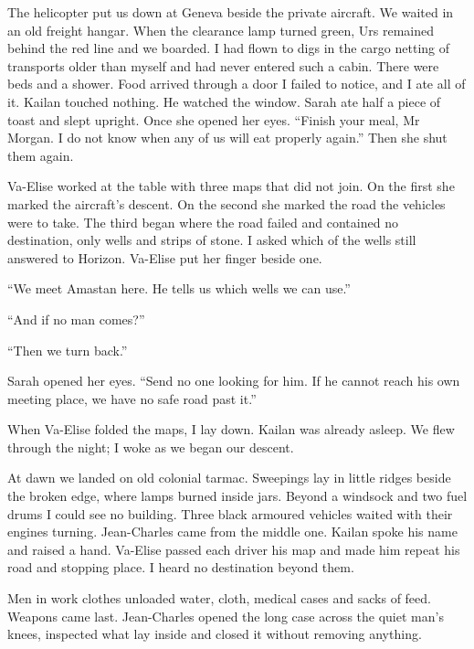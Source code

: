 The helicopter put us down at Geneva beside the private aircraft. We waited in an old freight hangar. When the clearance lamp turned green, Urs remained behind the red line and we boarded. I had flown to digs in the cargo netting of transports older than myself and had never entered such a cabin. There were beds and a shower. Food arrived through a door I failed to notice, and I ate all of it. Kailan touched nothing. He watched the window. Sarah ate half a piece of toast and slept upright. Once she opened her eyes. ``Finish your meal, Mr Morgan. I do not know when any of us will eat properly again.'' Then she shut them again.\par

Va-Elise worked at the table with three maps that did not join. On the first she marked the aircraft's descent. On the second she marked the road the vehicles were to take. The third began where the road failed and contained no destination, only wells and strips of stone. I asked which of the wells still answered to Horizon. Va-Elise put her finger beside one.\par

``We meet Amastan here. He tells us which wells we can use.''\par

``And if no man comes?''\par

``Then we turn back.''\par

Sarah opened her eyes. ``Send no one looking for him. If he cannot reach his own meeting place, we have no safe road past it.''\par

When Va-Elise folded the maps, I lay down. Kailan was already asleep. We flew through the night; I woke as we began our descent.\par

\ornament

At dawn we landed on old colonial tarmac. Sweepings lay in little ridges beside the broken edge, where lamps burned inside jars. Beyond a windsock and two fuel drums I could see no building. Three black armoured vehicles waited with their engines turning. Jean-Charles came from the middle one. Kailan spoke his name and raised a hand. Va-Elise passed each driver his map and made him repeat his road and stopping place. I heard no destination beyond them.\par

Men in work clothes unloaded water, cloth, medical cases and sacks of feed. Weapons came last. Jean-Charles opened the long case across the quiet man's knees, inspected what lay inside and closed it without removing anything.\par

